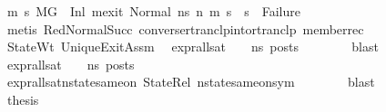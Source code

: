 \begin{isabellebody}
\ {\isachardoublequoteopen}{\isasymAnd}m{}{\isacharprime}{\kern0pt}\ s{}{\isacharprime}{\kern0pt}{\isachardot}{\kern0pt}\ {\isacharparenleft}{\kern0pt}M{\isacharcomma}{\kern0pt}{\isasymLambda}{\isacharcomma}{\kern0pt}{\isasymGamma}{\isacharcomma}{\kern0pt}{\isasymOmega}{\isacharcomma}{\kern0pt}G{}\ {\isasymturnstile}\ {\isacharparenleft}{\kern0pt}Inl\ m{}{\isacharunderscore}{\kern0pt}exit{\isacharcomma}{\kern0pt}\ Normal\ ns{}{\isacharprime}{\kern0pt}{\isacharparenright}{\kern0pt}\ {\isacharminus}{\kern0pt}n{\isasymrightarrow}{\isacharasterisk}{\kern0pt}\ {\isacharparenleft}{\kern0pt}m{}{\isacharprime}{\kern0pt}{\isacharcomma}{\kern0pt}\ s{}{\isacharprime}{\kern0pt}{\isacharparenright}{\kern0pt}{\isacharparenright}{\kern0pt}\ {\isasymLongrightarrow}\ s{}{\isacharprime}{\kern0pt}\ {\isasymnoteq}\ Failure{\isachardoublequoteclose}\isanewline
\ \ \ \ \ \ \isamarkupfalse%
\ {\isacharparenleft}{\kern0pt}metis\ RedNormalSucc\ converse{\isacharunderscore}{\kern0pt}rtranclp{\isacharunderscore}{\kern0pt}into{\isacharunderscore}{\kern0pt}rtranclp\ member{\isacharunderscore}{\kern0pt}rec{\isacharparenleft}{\kern0pt}{}{\isacharparenright}{\kern0pt}{\isacharparenright}{\kern0pt}\isanewline
\ \ \ \ \isamarkupfalse%
\ StateWt{}\ UniqueExitAssm\ \isamarkupfalse%
\ {\isachardoublequoteopen}{\isacharparenleft}{\kern0pt}expr{\isacharunderscore}{\kern0pt}all{\isacharunderscore}{\kern0pt}sat\ {\isasymLambda}\ {\isasymGamma}\ {\isasymOmega}\ ns{}{\isacharprime}{\kern0pt}{\isacharparenright}{\kern0pt}\ posts{\isachardoublequoteclose}\isanewline
\ \ \ \ \ \ \isamarkupfalse%
\ blast\isanewline
\ \ \ \ \isamarkupfalse%
\ {\isachardoublequoteopen}expr{\isacharunderscore}{\kern0pt}all{\isacharunderscore}{\kern0pt}sat\ {\isasymLambda}\ {\isasymGamma}\ {\isasymOmega}\ ns{}{\isacharprime}{\kern0pt}\ posts{\isachardoublequoteclose}\isanewline
\ \ \ \ \ \ \isamarkupfalse%
\ expr{\isacharunderscore}{\kern0pt}all{\isacharunderscore}{\kern0pt}sat{\isacharunderscore}{\kern0pt}nstate{\isacharunderscore}{\kern0pt}same{\isacharunderscore}{\kern0pt}on\ StateRel\ nstate{\isacharunderscore}{\kern0pt}same{\isacharunderscore}{\kern0pt}on{\isacharunderscore}{\kern0pt}sym\isanewline
\ \ \ \ \ \ \isamarkupfalse%
\ blast\ \ \ \ \ \ \isanewline
\ \ \ \ \isamarkupfalse%
\ {\isacharquery}{\kern0pt}thesis\isanewline

\end{isabellebody}
